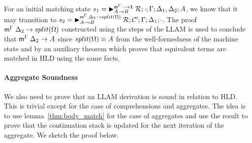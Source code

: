 For an initial matching state $s_1 = \matstate{A \lolli
B}{\rulestk}{\cdot}{\Gamma}{\Delta_1, \Delta_2}{A}{\cdot \rightarrow \one}$, we
know that it may transition to $s_2 = \matstate{A \lolli
B}{\rulestk}{\lstack{C'}}{\Gamma}{\Delta_1}{\cdot}{\Delta_2 \rightarrow
split(\Omega)}$. The proof $\mz{\Gamma}{\Delta_2}{split(\Omega)}$ constructed using the
steps of the LLAM is used to conclude that $\mz{\Gamma}{\Delta_2}{A}$ since
$\feq{split(\Omega)}{A}$ from the well-formedness of the machine state and by an
auxiliary theorem which proves that equivalent terms are matched in HLD using
the same facts.

\paragraph{Aggregate Soundness} We also need to prove that an LLAM derivation is
sound in relation to HLD. This is trivial except for the case of
comprehensions and aggregates. The idea is to use lemma~\ref{thm:body_match} for
the case of aggregates and use the result to
prove that the continuation stack is updated for the next iteration of the
aggregate. We sketch the proof below.

